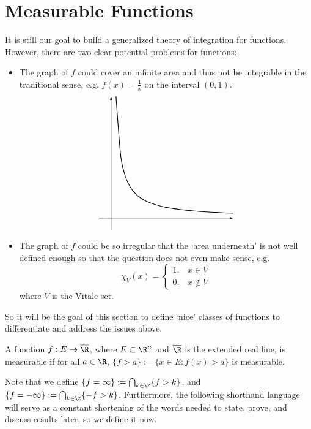 \newpage
\section{Measurable Functions}




It is still our goal to build a generalized theory of integration for functions. However, there are two clear potential problems for functions:
	\begin{itemize}
	\item The graph of $f$ could cover an infinite area and thus not be integrable in the traditional sense, e.g. $f(x)=\frac{1}{x}$ on the interval $(0,1)$. 
		\[
            	\begin{tikzpicture}
		\draw[thick,domain= 0.2:5,smooth,variable=\x] plot ({\x},{1/\x}); 
            
                	\coordinate (XAxisMin) at (-0.5,0);
                	\coordinate (XAxisMax) at (5,0);
                	\coordinate (YAxisMin) at (0,-0.5);
                	\coordinate (YAxisMax) at (0,5);
                	\draw [thin,-latex] (XAxisMin) -- (XAxisMax);
                	\draw [thin,-latex] (YAxisMin) -- (YAxisMax);	
            	\end{tikzpicture}
		\]
	\item The graph of $f$ could be so irregular that the `area underneath' is not well defined enough so that the question does not even make sense, e.g. 
		\[
		\chi_V(x)=
		\begin{cases}
		1, & x \in V \\
		0, & x \notin V
		\end{cases}
		\]
	where $V$ is the Vitale set. 
	\end{itemize}


So it will be the goal of this section to define `nice' classes of functions to differentiate and address the issues above.


\begin{dfn}
A function $f: E \to \overline{\R}$, where $E \subset \R^n$ and $\overline{\R}$ is the extended real line, is measurable if for all $a \in \R$, $\{f>a\}:=\{ x \in E \colon f(x)>a\}$ is measurable. 
\end{dfn}


Note that we define $\{ f=\infty\}:= \bigcap_{k \in \Z} \{ f>k \}$, and $\{ f= -\infty\}:= \bigcap_{k \in \Z} \{ -f>k\}$. Furthermore, the following shorthand language will serve as a constant shortening of the words needed to state, prove, and discuss results later, so we define it now.

